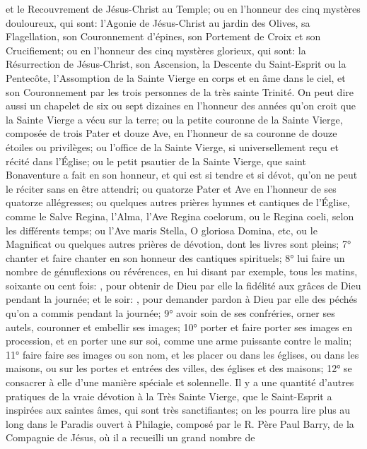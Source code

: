 et le Recouvrement de Jésus-Christ au Temple; ou en l'honneur des cinq mystères douloureux, qui sont: l'Agonie
de Jésus-Christ au jardin des Olives, sa Flagellation, son Couronnement d'épines, son Portement de Croix et son
Crucifiement; ou en l'honneur des cinq mystères glorieux, qui sont: la Résurrection de Jésus-Christ, son
Ascension, la Descente du Saint-Esprit ou la Pentecôte, l'Assomption de la Sainte Vierge en corps et en âme dans
le ciel, et son Couronnement par les trois personnes de la très sainte Trinité. On peut dire aussi un chapelet de six
ou sept dizaines en l'honneur des années qu'on croit que la Sainte Vierge a vécu sur la terre; ou la petite couronne
de la Sainte Vierge, composée de trois Pater et douze Ave, en l'honneur de sa couronne de douze étoiles ou
privilèges; ou l'office de la Sainte Vierge, si universellement reçu et récité dans l'Église; ou le petit psautier de la
Sainte Vierge, que saint Bonaventure a fait en son honneur, et qui est si tendre et si dévot, qu'on ne peut le réciter
sans en être attendri; ou quatorze Pater et Ave en l'honneur de ses quatorze allégresses; ou quelques autres
prières hymnes et cantiques de l'Église, comme le Salve Regina, l'Alma, l'Ave Regina coelorum, ou le Regina
coeli, selon les différents temps; ou l'Ave maris Stella, O gloriosa Domina, etc, ou le Magnificat ou quelques autres
prières de dévotion, dont les livres sont pleins; 7° chanter et faire chanter en son honneur des cantiques spirituels;
8° lui faire un nombre de génuflexions ou révérences, en lui disant par exemple, tous les matins, soixante ou cent
fois: , pour obtenir de Dieu par elle la fidélité aux grâces de Dieu pendant la journée; et le
soir: , pour demander pardon à Dieu par elle des péchés qu'on a commis pendant
la journée; 9° avoir soin de ses confréries, orner ses autels, couronner et embellir ses images; 10° porter et faire
porter ses images en procession, et en porter une sur soi, comme une arme puissante contre le malin; 11° faire
faire ses images ou son nom, et les placer ou dans les églises, ou dans les maisons, ou sur les portes et entrées
des villes, des églises et des maisons; 12° se consacrer à elle d'une manière spéciale et solennelle.
 Il y a une quantité d'autres pratiques de la vraie dévotion à la Très Sainte Vierge, que le Saint-Esprit a
inspirées aux saintes âmes, qui sont très sanctifiantes; on les pourra lire plus au long dans le Paradis ouvert à
Philagie, composé par le R. Père Paul Barry, de la Compagnie de Jésus, où il a recueilli un grand nombre de
